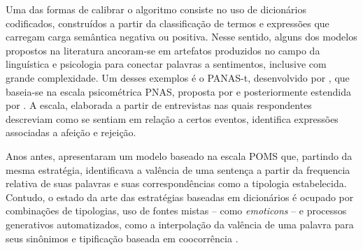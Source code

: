 \documentclass[
12pt,				%
openright,			%
twoside,			%
a4paper,			%
english,			%
french,				%
spanish,			%
brazil				%
]{abntex2}
\begin{document}
Uma das formas de calibrar o algoritmo consiste no uso de dicionários codificados, construídos a partir da classificação de termos e expressões que carregam carga semântica negativa ou positiva. Nesse sentido, alguns dos modelos propostos na literatura ancoram-se em artefatos produzidos no campo da linguística e psicologia para conectar palavras a sentimentos, inclusive com grande complexidade. Um desses exemplos é o PANAS-t, desenvolvido por  , que baseia-se na escala psicométrica PNAS, proposta por  e posteriormente estendida por . A escala, elaborada a partir de entrevistas nas quais respondentes descreviam como se sentiam em relação a certos eventos, identifica expressões associadas a afeição e rejeição. 

Anos antes,  apresentaram um modelo baseado na escala POMS \cite{mcnair2003profile} que, partindo da mesma estratégia, identificava a valência de uma sentença a partir da frequencia relativa de suas palavras e suas correspondências como a tipologia estabelecida. Contudo, o estado da arte das estratégias baseadas em dicionários é ocupado por combinações de tipologias, uso de fontes mistas -- como \emph{emoticons} --  e processos generativos automatizados, como a interpolação da valência de uma palavra para seus sinônimos e tipificação baseada em coocorrência \cite{hogenboom2013exploiting, hutto2014vader, thelwall2014sentistrength, canuto2016exploiting}.
\end{document}
